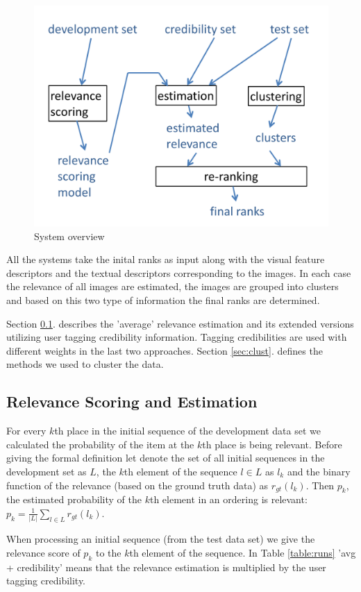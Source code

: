 \documentclass{acm_proc_article-me}
\begin{document}
\begin{figure}[t]
\centering
\includegraphics[width=0.8\linewidth]{BlockDiagram}
\caption{System overview}
\label{fig:block}
\end{figure}

All the systems take the inital ranks as input along with the visual feature descriptors and the textual descriptors corresponding to the images. In each case the relevance of all images are estimated, the images are grouped into clusters and based on this two type of information the final ranks are determined.

Section \ref{sec:relevance}. describes the 'average' relevance estimation and its extended versions utilizing user tagging credibility information. Tagging credibilities are used with different weights in the last two approaches. Section \ref{sec:clust}. defines the methods we used to cluster the data.

\subsection{Relevance Scoring and Estimation}
\label{sec:relevance}

For every $k$th place in the initial sequence of the development data set we calculated the probability of the item at the $k$th place is being relevant. Before giving the formal definition let denote the set of all initial sequences in the development set as $L$, the $k$th element of the sequence $l \in L$ as $l_k$ and the binary function of the relevance (based on the ground truth data) as $r_{gt}(l_k)$. Then $p_k$, the estimated probability of the $k$th element in an ordering is relevant:
$p_k = \frac{1}{|L|}\sum_{l \in L}r_{gt}(l_k)$.

When processing an initial sequence (from the test data set) we give the relevance score of $p_k$ to the $k$th element of the sequence. In Table \ref{table:runs} 'avg + credibility' means that the relevance estimation is multiplied by the user tagging credibility.
\end{document}
